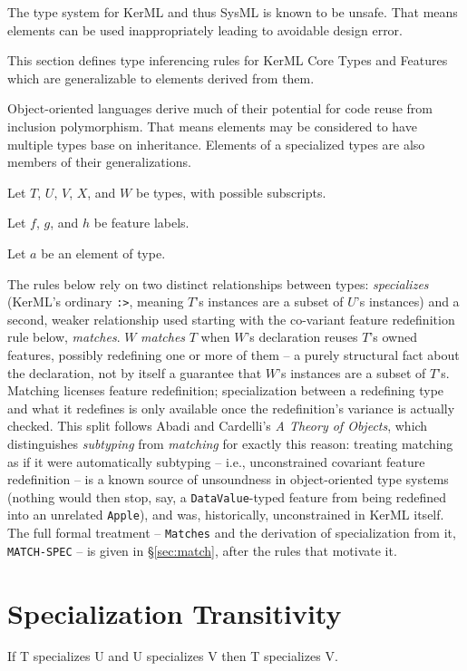 

The type system for KerML and thus SysML is known to be unsafe.  That means elements can be used inappropriately leading to avoidable design error.

This section defines type inferencing rules for KerML Core Types and Features which are generalizable to elements derived from them.

Object-oriented languages derive much of their potential for code reuse from inclusion polymorphism.  That means elements may be considered to have multiple types base on inheritance.  Elements of a specialized types are also members of their generalizations.

Let $T$, $U$, $V$, $X$, and $W$ be types, with possible subscripts.

Let $f$, $g$, and $h$ be feature labels.

Let $a$ be an element of type.

The rules below rely on two distinct relationships between types: \emph{specializes} (KerML's
ordinary \texttt{:>}, meaning $T$'s instances are a subset of $U$'s instances) and a second, weaker
relationship used starting with the co-variant feature redefinition rule below, \emph{matches}. $W$
\emph{matches} $T$ when $W$'s
declaration reuses $T$'s owned features, possibly redefining one or more of them -- a purely
structural fact about the declaration, not by itself a guarantee that $W$'s instances are a subset of
$T$'s. Matching licenses feature redefinition; specialization between a redefining type and what it
redefines is only available once the redefinition's variance is actually checked. This split follows
Abadi and Cardelli's \emph{A Theory of Objects}\cite{theory-of-objects}, which distinguishes \emph{subtyping} from
\emph{matching} for exactly this reason: treating matching as if it were automatically subtyping --
i.e., unconstrained covariant feature redefinition -- is a known source of unsoundness in
object-oriented type systems (nothing would then stop, say, a \texttt{DataValue}-typed feature from
being redefined into an unrelated \texttt{Apple}), and was, historically, unconstrained in KerML
itself. The full formal treatment -- \texttt{Matches} and the derivation of specialization from it,
\texttt{MATCH-SPEC} -- is given in \S\ref{sec:match}, after the rules that motivate it.

\section{Specialization Transitivity}
If T specializes U and U specializes V then T specializes V.


